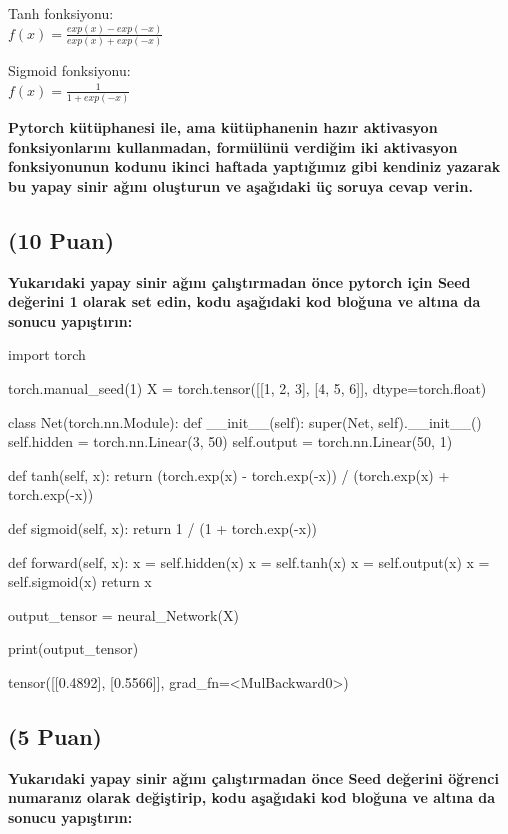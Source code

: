 \documentclass[11pt]{article}
\begin{document}
Tanh fonksiyonu:\\
$f(x) = \frac{exp(x) - exp(-x)}{exp(x) + exp(-x)}$
\vspace{.2in}

Sigmoid fonksiyonu:\\
$f(x) = \frac{1}{1 + exp(-x)}$

\vspace{.2in}
 \textbf{Pytorch kütüphanesi ile, ama kütüphanenin hazır aktivasyon fonksiyonlarını kullanmadan, formülünü verdiğim iki aktivasyon fonksiyonunun kodunu ikinci haftada yaptığımız gibi kendiniz yazarak bu yapay sinir ağını oluşturun ve aşağıdaki üç soruya cevap verin.}
 
\subsection{(10 Puan)} \textbf{Yukarıdaki yapay sinir ağını çalıştırmadan önce pytorch için Seed değerini 1 olarak set edin, kodu aşağıdaki kod bloğuna ve altına da sonucu yapıştırın:}

\begin{python}

import torch


torch.manual_seed(1)
X = torch.tensor([[1, 2, 3], [4, 5, 6]], dtype=torch.float)

class Net(torch.nn.Module):
    def __init__(self):
        super(Net, self).__init__()
        self.hidden = torch.nn.Linear(3, 50)
        self.output = torch.nn.Linear(50, 1)
        
    def tanh(self, x):
        return (torch.exp(x) - torch.exp(-x)) / (torch.exp(x) + torch.exp(-x))
    
    def sigmoid(self, x):
        return 1 / (1 + torch.exp(-x))
        
    def forward(self, x):
        x = self.hidden(x)
        x = self.tanh(x)
        x = self.output(x)
        x = self.sigmoid(x)
        return x


output_tensor = neural_Network(X)

print(output_tensor)

\end{python}

tensor([[0.4892],
        [0.5566]], grad_fn=<MulBackward0>)
\subsection{(5 Puan)} \textbf{Yukarıdaki yapay sinir ağını çalıştırmadan önce Seed değerini öğrenci numaranız olarak değiştirip, kodu aşağıdaki kod bloğuna ve altına da sonucu yapıştırın:}
\end{document}
